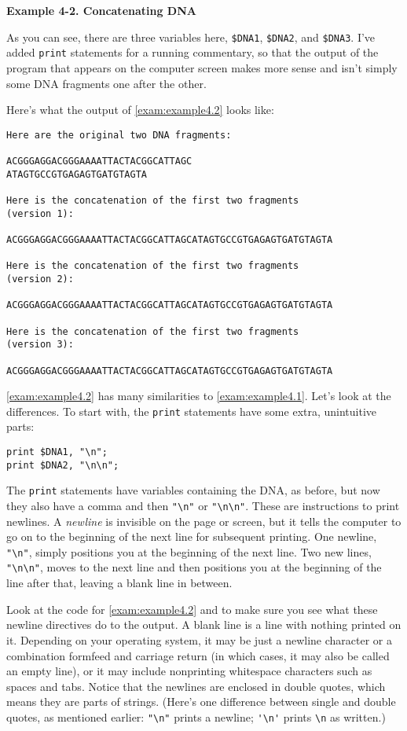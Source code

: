 \textbf{Example 4-2. Concatenating DNA}


As you can see, there are three variables here, \verb|$DNA1|, \verb|$DNA2|, and \verb|$DNA3|. I've added \verb|print| statements for a running commentary, so that the output of the program that appears on the computer screen makes more sense and isn't simply some DNA fragments one after the other.

Here's what the output of \autoref{exam:example4.2} looks like:

\begin{lstlisting}
Here are the original two DNA fragments:

ACGGGAGGACGGGAAAATTACTACGGCATTAGC
ATAGTGCCGTGAGAGTGATGTAGTA

Here is the concatenation of the first two fragments
(version 1):

ACGGGAGGACGGGAAAATTACTACGGCATTAGCATAGTGCCGTGAGAGTGATGTAGTA

Here is the concatenation of the first two fragments
(version 2):

ACGGGAGGACGGGAAAATTACTACGGCATTAGCATAGTGCCGTGAGAGTGATGTAGTA

Here is the concatenation of the first two fragments
(version 3):

ACGGGAGGACGGGAAAATTACTACGGCATTAGCATAGTGCCGTGAGAGTGATGTAGTA
\end{lstlisting}

\autoref{exam:example4.2} has many similarities to
\autoref{exam:example4.1}. Let's look at the differences. To start with, the \verb|print| statements have some extra, unintuitive parts:

\begin{lstlisting}
print $DNA1, "\n";
print $DNA2, "\n\n";
\end{lstlisting}

The \verb|print| statements have variables containing the DNA, as before, but now they also have a comma and then \verb|"\n"| or \verb|"\n\n"|. These are instructions to print newlines. A \textit{newline} is invisible on the page or screen, but it tells the computer to go on to the beginning of the next line for subsequent printing. One newline, \verb|"\n"|, simply positions you at the beginning of the next line. Two new lines, \verb|"\n\n"|, moves to the next line and then positions you at the beginning of the line after that, leaving a blank line in between.  

Look at the code for \autoref{exam:example4.2} and to make sure you see what these newline directives do to the output. A blank line is a line with nothing printed on it. Depending on your operating system, it may be just a newline character or a combination formfeed and carriage return (in which cases, it may also be called an empty line), or it may include nonprinting whitespace characters such as spaces and tabs. Notice that the newlines are enclosed in double quotes, which means they are parts of strings. (Here's one difference between single and double quotes, as mentioned earlier: \verb|"\n"| prints a newline; \verb|'\n'| prints \verb|\n| as written.)

